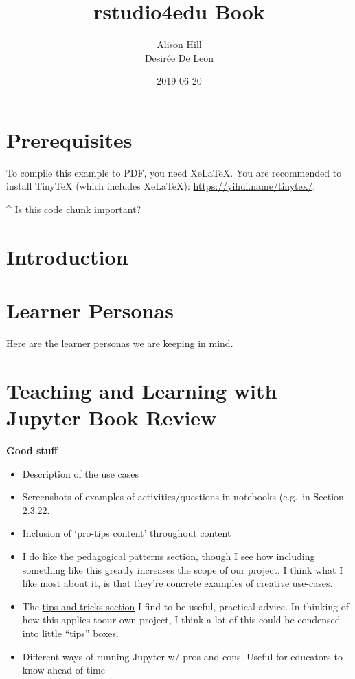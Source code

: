 \documentclass[]{book}
\title{rstudio4edu Book}
\author{Alison Hill \\ Desirée De Leon}
\date{2019-06-20}
\providecommand{\tightlist}{%
  \setlength{\itemsep}{0pt}\setlength{\parskip}{0pt}}
\begin{document}
\maketitle

{
\setcounter{tocdepth}{1}
\tableofcontents
}
\hypertarget{prerequisites}{%
\chapter*{Prerequisites}\label{prerequisites}}

To compile this example to PDF, you need XeLaTeX. You are recommended to install TinyTeX (which includes XeLaTeX): \url{https://yihui.name/tinytex/}.

\^{} Is this code chunk important?

\hypertarget{intro}{%
\chapter{Introduction}\label{intro}}

\hypertarget{learner-personas}{%
\chapter{Learner Personas}\label{learner-personas}}

Here are the learner personas we are keeping in mind.

\hypertarget{teaching-and-learning-with-jupyter-book-review}{%
\chapter{Teaching and Learning with Jupyter Book Review}\label{teaching-and-learning-with-jupyter-book-review}}

\textbf{Good stuff}

\begin{itemize}
\tightlist
\item
  Description of the use cases
\item
  Screenshots of examples of activities/questions in notebooks (e.g.~in Section \href{https://jupyter4edu.github.io/jupyter-edu-book/why-we-use-jupyter-notebooks.html\#why-do-we-use-jupyter}{2}.3.22.
\item
  Inclusion of `pro-tips content' throughout content
\item
  I do like the pedagogical patterns section, though I see how including something like this greatly increases the scope of our project. I think what I like most about it, is that they're concrete examples of creative use-cases.
\item
  The \href{https://jupyter4edu.github.io/jupyter-edu-book/jupyter.html\#tips-and-tricks}{tips and tricks section} I find to be useful, practical advice. In thinking of how this applies toour own project, I think a lot of this could be condensed into little ``tips'' boxes.
\item
  Different ways of running Jupyter w/ pros and cons. Useful for educators to know ahead of time
\end{itemize}
\end{document}
